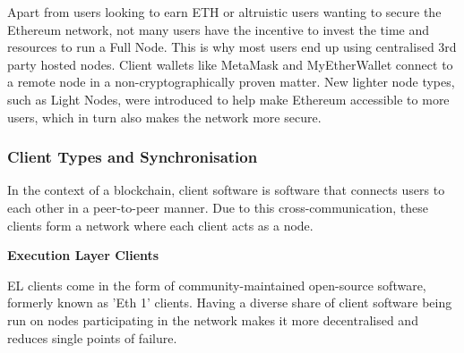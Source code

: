 Apart from users looking to earn ETH or altruistic users wanting to secure the Ethereum network, not many users have the incentive to invest the time and resources to run a Full Node. This is why most users end up using centralised 3rd party hosted nodes. Client wallets like MetaMask and MyEtherWallet connect to a remote node in a non-cryptographically proven matter. New lighter node types, such as Light Nodes, were introduced to help make Ethereum accessible to more users, which in turn also makes the network more secure.





\subsubsection{Client Types and Synchronisation}

In the context of a blockchain, client software is software that connects users to each other in a peer-to-peer manner. Due to this cross-communication, these clients form a network where each client acts as a node. 

\textbf{Execution Layer Clients}

EL clients come in the form of community-maintained open-source software, formerly known as 'Eth 1' clients. Having a diverse share of client software being run on nodes participating in the network makes it more decentralised and reduces single points of failure.

